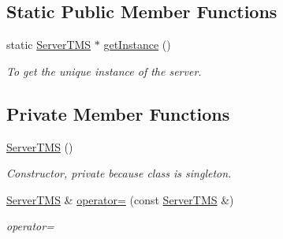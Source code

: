 \subsection*{Static Public Member Functions}
\begin{DoxyCompactItemize}
\item 
\hypertarget{classServerTMS_a8880ada96e5fa2e57b5ffdbe82cc3c56}{
static \hyperlink{classServerTMS}{ServerTMS} $\ast$ \hyperlink{classServerTMS_a8880ada96e5fa2e57b5ffdbe82cc3c56}{getInstance} ()}
\label{classServerTMS_a8880ada96e5fa2e57b5ffdbe82cc3c56}

\begin{DoxyCompactList}\small\item\em To get the unique instance of the server. \item\end{DoxyCompactList}\end{DoxyCompactItemize}
\subsection*{Private Member Functions}
\begin{DoxyCompactItemize}
\item 
\hypertarget{classServerTMS_ab53abf4787d825412407c130155dd28b}{
\hyperlink{classServerTMS_ab53abf4787d825412407c130155dd28b}{ServerTMS} ()}
\label{classServerTMS_ab53abf4787d825412407c130155dd28b}

\begin{DoxyCompactList}\small\item\em Constructor, private because class is singleton. \item\end{DoxyCompactList}\item 
\hypertarget{classServerTMS_aa966756d974810cbb474aa0f620dc6fc}{
\hyperlink{classServerTMS}{ServerTMS} \& \hyperlink{classServerTMS_aa966756d974810cbb474aa0f620dc6fc}{operator=} (const \hyperlink{classServerTMS}{ServerTMS} \&)}
\label{classServerTMS_aa966756d974810cbb474aa0f620dc6fc}

\begin{DoxyCompactList}\small\item\em operator= \item\end{DoxyCompactList}\end{DoxyCompactItemize}
